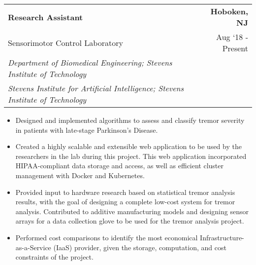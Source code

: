 \documentclass[10pt, letterpaper]{letter}
\begin{document}
    
        \begin{tabularx}{\textwidth}{X r}
            \textbf{Research Assistant} & \textbf{Hoboken, 
        NJ} \\
            Sensorimotor Control Laboratory & 
        
    Aug ‘18 - Present \\
            
                \textit{Department of Biomedical Engineering; Stevens Institute of Technology} & \\
            
                \textit{Stevens Institute for Artificial Intelligence; Stevens Institute of Technology} & \\
            
            
        \end{tabularx}
        \vspace{-1em}
        \begin{itemize}[noitemsep, topsep=0pt, parsep=0pt, partopsep=0pt]
            
                \item 
    Designed and implemented algorithms to assess and classify tremor severity in patients with late-stage Parkinson's Disease.
            
                \item 
    Created a highly scalable and extensible web application to be used by the researchers in the lab during this project. This web application incorporated HIPAA-compliant data storage and access, as well as efficient cluster management with Docker and Kubernetes.
            
                \item 
    Provided input to hardware research based on statistical tremor analysis results, with the goal of designing a complete low-cost system for tremor analysis. Contributed to additive manufacturing models and designing sensor arrays for a data collection glove to be used for the tremor analysis project.
            
                \item 
    Performed cost comparisons to identify the most economical Infrastructure-as-a-Service (IaaS) provider, given the storage, computation, and cost constraints of the project.
            
        \end{itemize}
    
\end{document}
